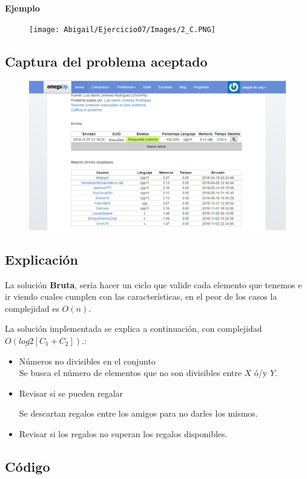\documentclass[12pt]{article}
\begin{document}
        \textbf{Ejemplo}    \\
        \begin{figure}[h!]
            \centering
            \texttt{[image: Abigail/Ejercicio07/Images/2\_C.PNG]}
        \end{figure} 
        
\newpage

    \subsection{Captura del problema aceptado}
        \begin{figure}[h!]
            \centering
            \includegraphics[width=1.0\textwidth]{Abigail/Ejercicio06/Images/2_A.PNG}
        \end{figure} 
      
    \subsection{Explicación}
    La solución \textbf{Bruta}, sería hacer un ciclo que valide cada elemento que tenemos e ir viendo cuales cumplen con las características, en el peor de los casos la complejidad es $O(n)$.
    
    La solución implementada se explica a continuación, con complejidad $O\left(log2[C_{1}+C_{2}]\right)$.:
    
        \begin{itemize}
            \item Números no divisibles en el conjunto  \\
            
            Se busca el número de elementos que no son divisibles entre $X$ ó/y $Y$. 
            
            \item Revisar si se pueden regalar
            
            Se descartan regalos entre los amigos para no darles los mismos. 
            
            \item Revisar si los regalos no superan los regalos disponibles.
        \end{itemize}
\newpage
    \subsection{Código}
        \inputminted{c++}{Code/2.c}
\end{document}
